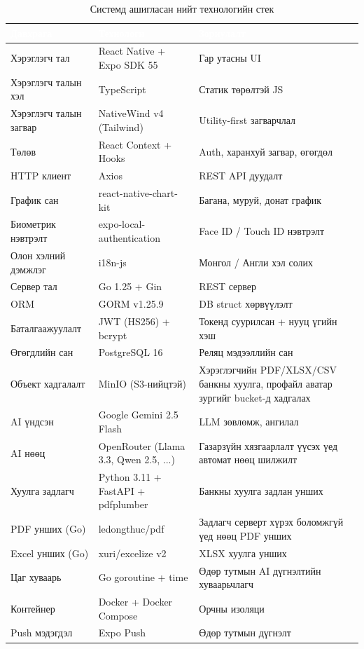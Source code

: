\begin{table}[ht]
\centering
\footnotesize
\renewcommand{\arraystretch}{1.25}
\begin{tabular}{|p{2.7cm}|p{4.3cm}|p{4.6cm}|}
\hline
\rowcolor{darknavy}
\textcolor{white}{\textbf{Давхрага}} & \textcolor{white}{\textbf{Технологи}} & \textcolor{white}{\textbf{Зориулалт}} \\ \hline
Хэрэглэгч тал         & React Native + Expo SDK 55  & Гар утасны UI \\ \hline
Хэрэглэгч талын хэл     & TypeScript                  & Статик төрөлтэй JS \\ \hline
Хэрэглэгч талын загвар   & NativeWind v4 (Tailwind)    & Utility-first загварчлал \\ \hline
Төлөв            & React Context + Hooks       & Auth, харанхуй загвар, өгөгдөл \\ \hline
HTTP клиент      & Axios                       & REST API дуудалт \\ \hline
График сан       & react-native-chart-kit      & Багана, муруй, донат график \\ \hline
Биометрик нэвтрэлт & expo-local-authentication & Face ID / Touch ID нэвтрэлт \\ \hline
Олон хэлний дэмжлэг & i18n-js                  & Монгол / Англи хэл солих \\ \hline
Сервер тал          & Go 1.25 + Gin               & REST сервер \\ \hline
ORM              & GORM v1.25.9                & DB struct хөрвүүлэлт \\ \hline
Баталгаажуулалт  & JWT (HS256) + bcrypt        & Токенд суурилсан + нууц үгийн хэш \\ \hline
Өгөгдлийн сан    & PostgreSQL 16               & Реляц мэдээллийн сан \\ \hline
Объект хадгалалт & MinIO (S3-нийцтэй)          & Хэрэглэгчийн PDF/XLSX/CSV банкны хуулга, профайл аватар зургийг bucket-д хадгалах \\ \hline
AI үндсэн        & Google Gemini 2.5 Flash      & LLM зөвлөмж, ангилал \\ \hline
AI нөөц          & OpenRouter (Llama 3.3, Qwen 2.5, ...) & Газарзүйн хязгаарлалт үүсэх үед автомат нөөц шилжилт \\ \hline
Хуулга задлагч  & Python 3.11 + FastAPI + pdfplumber & Банкны хуулга задлан унших \\ \hline
PDF унших (Go)   & ledongthuc/pdf              & Задлагч серверт хүрэх боломжгүй үед нөөц PDF унших \\ \hline
Excel унших (Go) & xuri/excelize v2            & XLSX хуулга унших \\ \hline
Цаг хуваарь      & Go goroutine + time         & Өдөр тутмын AI дүгнэлтийн хуваарьчлагч \\ \hline
Контейнер        & Docker + Docker Compose     & Орчны изоляци \\ \hline
Push мэдэгдэл    & Expo Push                   & Өдөр тутмын дүгнэлт \\ \hline
\end{tabular}
\caption{Системд ашигласан нийт технологийн стек}
\label{tab:stack-summary}
\end{table}

